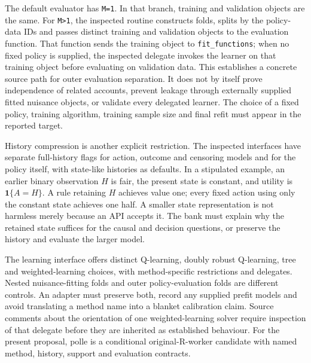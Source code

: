 The default evaluator has \texttt{M=1}. In that branch, training and validation
objects are the same. For \texttt{M>1}, the inspected routine constructs folds,
splits by the policy-data IDs and passes distinct training and validation objects
to the evaluation function. That function sends the training object to
\texttt{fit\_functions}; when no fixed policy is supplied, the inspected delegate
invokes the learner on that training object before evaluating on validation data.
This establishes a concrete source path for outer evaluation separation. It does
not by itself prove independence of related accounts, prevent leakage through
externally supplied fitted nuisance objects, or validate every delegated learner.
The choice of a fixed policy, training algorithm, training sample size and final
refit must appear in the reported target.\citep{exec24_policiesr_polle}

History compression is another explicit restriction. The inspected interfaces have
separate full-history flags for action, outcome and censoring models and for the
policy itself, with state-like histories as defaults. In a stipulated example,
an earlier binary observation $H$ is fair, the present state is constant, and utility
is $\mathbf1\{A=H\}$. A rule retaining $H$ achieves value one; every fixed action
using only the constant state achieves one half. A smaller state representation is
not harmless merely because an API accepts it. The bank must explain why the
retained state suffices for the causal and decision questions, or preserve the
history and evaluate the larger model.\citep{exec24_policiesr_polle,exec24_policiesr_reference}

The learning interface offers distinct Q-learning, doubly robust Q-learning, tree
and weighted-learning choices, with method-specific restrictions and delegates.
Nested nuisance-fitting folds and outer policy-evaluation folds are different
controls. An adapter must preserve both, record any supplied prefit models and
avoid translating a method name into a blanket calibration claim. Source comments
about the orientation of one weighted-learning solver require inspection of that
delegate before they are inherited as established behaviour. For the present
proposal, polle is a conditional original-R-worker candidate with named method,
history, support and evaluation contracts.\citep{exec24_policiesr_polle}

